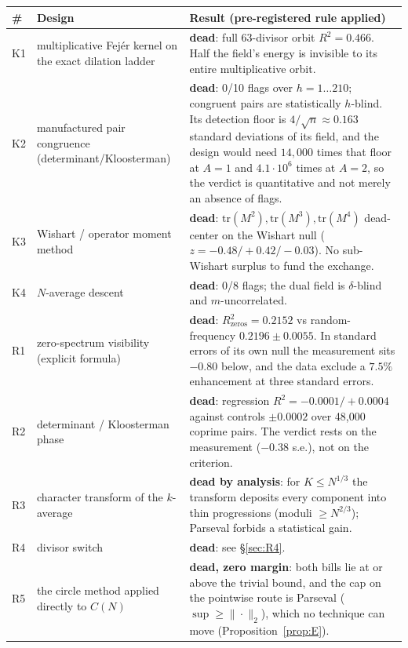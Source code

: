 \documentclass[11pt,a4paper]{article}
\theoremstyle{plain}
\theoremstyle{definition}
\begin{document}
\begin{longtable}{p{}p{}p{}}
\hline
\# & Design & Result (pre-registered rule applied)\\
\hline
\endhead
K1 & multiplicative Fej\'er kernel on the exact dilation ladder &
 \textbf{dead}: full 63-divisor orbit $R^2 = 0.466$. Half the field's
 energy is invisible to its entire multiplicative orbit.\\
K2 & manufactured pair congruence (determinant/Kloosterman) &
 \textbf{dead}: 0/10 flags over $h = 1\ldots210$; congruent pairs are
 statistically $h$-blind. Its detection floor is
 $4/\sqrt n \approx 0.163$ standard deviations of its field, and the
 design would need $14{,}000$ times that floor at $A=1$ and
 $4.1\cdot10^6$ times at $A=2$, so the verdict is quantitative and not
 merely an absence of flags.\\
K3 & Wishart / operator moment method &
 \textbf{dead}: $\mathrm{tr}(M^2),\mathrm{tr}(M^3),\mathrm{tr}(M^4)$
 dead-center on the Wishart null ($z = -0.48/+0.42/-0.03$). No
 sub-Wishart surplus to fund the exchange.\\
K4 & $N$-average descent &
 \textbf{dead}: 0/8 flags; the dual field is $\delta$-blind and
 $m$-uncorrelated.\\
R1 & zero-spectrum visibility (explicit formula) &
 \textbf{dead}: $R^2_{\text{zeros}} = 0.2152$ vs random-frequency
 $0.2196\pm0.0055$. In standard errors of its own null the measurement
 sits $-0.80$ below, and the data exclude a $7.5\%$ enhancement at
 three standard errors.\\
R2 & determinant / Kloosterman phase &
 \textbf{dead}: regression $R^2 = -0.0001/+0.0004$ against controls
 $\pm0.0002$ over 48{,}000 coprime pairs. The verdict rests on the
 measurement ($-0.38$ s.e.), not on the criterion.\\
R3 & character transform of the $k$-average &
 \textbf{dead by analysis}: for $K \le N^{1/3}$ the transform deposits
 every component into thin progressions (moduli $\ge N^{2/3}$);
 Parseval forbids a statistical gain.\\
R4 & divisor switch &
 \textbf{dead}: see \S\ref{sec:R4}.\\
R5 & the circle method applied directly to $C(N)$ &
 \textbf{dead, zero margin}: both bills lie at or above the trivial
 bound, and the cap on the pointwise route is Parseval
 ($\sup\ge\|\cdot\|_2$), which no technique can move
 (Proposition~\ref{prop:E}).\\
\hline
\end{longtable}
\end{document}
